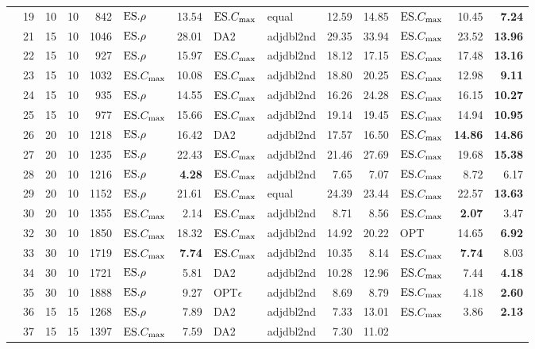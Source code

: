 {\begin{longtable}{l@{}rr@{$\times$}lr|lr|llr|r|lr|r}
&19 & 10&10 & 842 & $\text{ES}.{\rho}$ & 13.54 & $\text{ES}.{C_{\max}}$ & equal & 12.59 & 14.85 & 
$\text{ES}.{C_{\max}}$ & 10.45 & \textbf{7.24} \\ 
&21 & 15&10 & 1046 & $\text{ES}.{\rho}$ & 28.01 & DA2 & adjdbl2nd & 29.35 & 
33.94 & $\text{ES}.{C_{\max}}$ & 23.52 & \textbf{13.96} \\ 
&22 & 15&10 & 927 & $\text{ES}.{\rho}$ & 15.97 & $\text{ES}.{C_{\max}}$ & adjdbl2nd & 18.12 & 17.15 
& $\text{ES}.{C_{\max}}$ & 17.48 & \textbf{13.16} \\ 
&23 & 15&10 & 1032 & $\text{ES}.{C_{\max}}$ & 10.08 & $\text{ES}.{C_{\max}}$ & adjdbl2nd & 18.80 & 
20.25 
& $\text{ES}.{C_{\max}}$ & 12.98 & \textbf{9.11} \\ 
&24 & 15&10 & 935 & $\text{ES}.{\rho}$ & 14.55 & $\text{ES}.{C_{\max}}$ & adjdbl2nd & 16.26 & 24.28 
& $\text{ES}.{C_{\max}}$ & 16.15 & \textbf{10.27} \\ 
&25 & 15&10 & 977 & $\text{ES}.{C_{\max}}$ & 15.66 & $\text{ES}.{C_{\max}}$ & adjdbl2nd & 19.14 & 19.45 
& $\text{ES}.{C_{\max}}$ & 14.94 & \textbf{10.95} \\ 
&26 & 20&10 & 1218 & $\text{ES}.{\rho}$ & 16.42 & DA2 & adjdbl2nd & 17.57 & 16.50 
& $\text{ES}.{C_{\max}}$ & \textbf{14.86} & \textbf{14.86} \\ 
&27 & 20&10 & 1235 & $\text{ES}.{\rho}$ & 22.43 & $\text{ES}.{C_{\max}}$ & adjdbl2nd & 21.46 & 27.69 
& $\text{ES}.{C_{\max}}$ & 19.68 & \textbf{15.38} \\ 
&28 & 20&10 & 1216 & $\text{ES}.{\rho}$ & \textbf{4.28} & $\text{ES}.{C_{\max}}$ & adjdbl2nd & 7.65 
& 7.07 & $\text{ES}.{C_{\max}}$ & 8.72 & 6.17 \\ 
&29 & 20&10 & 1152 & $\text{ES}.{\rho}$ & 21.61 & $\text{ES}.{C_{\max}}$ & equal & 24.39 & 23.44 & 
$\text{ES}.{C_{\max}}$ & 22.57 & \textbf{13.63} \\ 
&30 & 20&10 & 1355 & $\text{ES}.{C_{\max}}$ & 2.14 & $\text{ES}.{C_{\max}}$ & adjdbl2nd & 8.71 & 8.56 & 
$\text{ES}.{C_{\max}}$ & \textbf{2.07} & 3.47 \\ 
&32 & 30&10 & 1850 & $\text{ES}.{C_{\max}}$ & 18.32 & $\text{ES}.{C_{\max}}$ & adjdbl2nd & 14.92 & 
20.22 & OPT & 14.65 & \textbf{6.92} \\ 
&33 & 30&10 & 1719 & $\text{ES}.{C_{\max}}$ & \textbf{7.74} & $\text{ES}.{C_{\max}}$ & adjdbl2nd & 
10.35 & 8.14 & $\text{ES}.{C_{\max}}$ & \textbf{7.74} & 8.03 \\ 
&34 & 30&10 & 1721 & $\text{ES}.{\rho}$ & 5.81 & DA2 & adjdbl2nd & 10.28 & 12.96 
& $\text{ES}.{C_{\max}}$ & 7.44 & \textbf{4.18} \\ 
&35 & 30&10 & 1888 & $\text{ES}.{\rho}$ & 9.27 & OPT$\epsilon$ & adjdbl2nd & 8.69 & 8.79 
& $\text{ES}.{C_{\max}}$ & 4.18 & \textbf{2.60} \\ 
&36 & 15&15 & 1268 & $\text{ES}.{\rho}$ & 7.89 & DA2 & adjdbl2nd & 7.33 & 13.01 
& $\text{ES}.{C_{\max}}$ & 3.86 & \textbf{2.13} \\ 
&37 & 15&15 & 1397 & $\text{ES}.{C_{\max}}$ & 7.59 & DA2 & adjdbl2nd & 7.30 & 11.02 

\end{longtable}}
